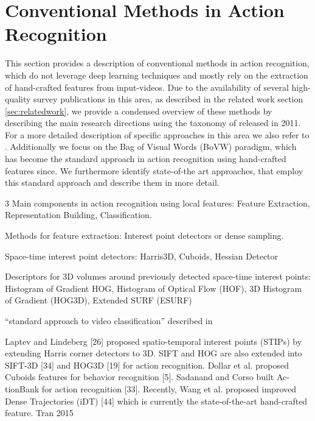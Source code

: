 \section{Conventional Methods in Action Recognition}
\label{chap:conventional}

This section provides a description of conventional methods in action recognition, which do not leverage deep learning techniques and mostly rely on the extraction of hand-crafted features from input-videos.
Due to the availability of several high-quality survey publications in this area, as described in the related work section \ref{sec:relatedwork}, we provide a condensed overview of these methods by describing the main research directions using the taxonomy of \textcite{aggarwal_human_2011} released in 2011.
For a more detailed description of specific approaches in this area we also refer to \cite{aggarwal_human_2011}.
Additionally we focus on the Bag of Visual Words (BoVW) paradigm, which has become the standard approach in action recognition using hand-crafted features since.
We furthermore identify state-of-the art approaches, that employ this standard approach and describe them in more detail.


3 Main components in action recognition using local features: Feature Extraction, Representation Building, Classification.

Methods for feature extraction: Interest point detectors or dense sampling.

Space-time interest point detectors: Harris3D\cite{laptev_space-time_2005}, Cuboids\cite{dollar_behavior_2005}, Hessian Detector\cite{willems_efficient_2008}

Descriptors for 3D volumes around previously detected space-time interest points: Histogram of Gradient HOG\cite{dalal_histograms_2005-1}, Histogram of Optical Flow (HOF)\cite{laptev_learning_2008}, 3D Histogram of Gradient (HOG3D)\cite{klaser_spatio-temporal_2008}, Extended SURF (ESURF)\cite{willems_efficient_2008}

``standard approach to video classification'' described in \cite{karpathy_large-scale_2014}

Laptev and Lindeberg [26] proposed spatio-temporal interest points (STIPs)
by extending Harris corner detectors to 3D. SIFT and HOG
are also extended into SIFT-3D [34] and HOG3D [19] for
action recognition. Dollar et al. proposed Cuboids features
for behavior recognition [5]. Sadanand and Corso built Ac-
tionBank for action recognition [33]. Recently, Wang et al.
proposed improved Dense Trajectories (iDT) [44] which is
currently the state-of-the-art hand-crafted feature. Tran 2015

